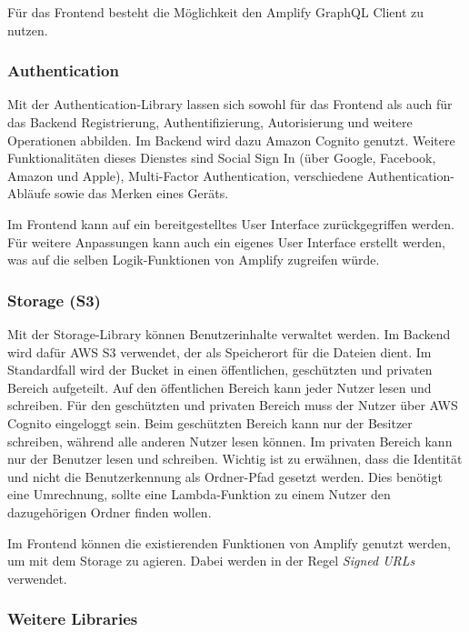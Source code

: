 Für das Frontend besteht die Möglichkeit den Amplify GraphQL Client zu nutzen.

\subsubsection{Authentication}

Mit der Authentication-Library lassen sich sowohl für das Frontend als auch für das Backend Registrierung, Authentifizierung, Autorisierung und weitere Operationen abbilden. Im Backend wird dazu Amazon Cognito genutzt. Weitere Funktionalitäten dieses Dienstes sind Social Sign In (über Google, Facebook, Amazon und Apple), Multi-Factor Authentication, verschiedene Authentication-Abläufe sowie das Merken eines Geräts.

Im Frontend kann auf ein bereitgestelltes User Interface zurückgegriffen werden. Für weitere Anpassungen kann auch ein eigenes User Interface erstellt werden, was auf die selben Logik-Funktionen von Amplify zugreifen würde.

\subsubsection{Storage (S3)}

Mit der Storage-Library können Benutzerinhalte verwaltet werden. Im Backend wird dafür \ac{AWS} S3 verwendet, der als Speicherort für die Dateien dient. Im Standardfall wird der Bucket in einen öffentlichen, geschützten und privaten Bereich aufgeteilt. Auf den öffentlichen Bereich kann jeder Nutzer lesen und schreiben. Für den geschützten und privaten Bereich muss der Nutzer über \ac{AWS} Cognito eingeloggt sein. Beim geschützten Bereich kann nur der Besitzer schreiben, während alle anderen Nutzer lesen können. Im privaten Bereich kann nur der Benutzer lesen und schreiben. Wichtig ist zu erwähnen, dass die Identität und nicht die Benutzerkennung als Ordner-Pfad gesetzt werden. Dies benötigt eine Umrechnung, sollte eine Lambda-Funktion zu einem Nutzer den dazugehörigen Ordner finden wollen.

Im Frontend können die existierenden Funktionen von Amplify genutzt werden, um mit dem Storage zu agieren. Dabei werden in der Regel \textit{Signed URLs} verwendet.

\subsubsection{Weitere Libraries}


